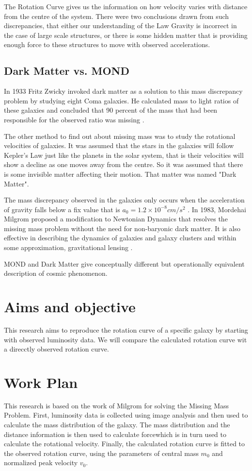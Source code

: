  The Rotation Curve gives us the information on how   velocity varies with distance from the centre of the system. There were two conclusions drawn from such discrepancies, that either our understanding of the Law Gravity is incorrect in the case of large scale structures, or there is some hidden matter that is providing enough force to these structures to move with observed accelerations.

\subsection{Dark Matter vs. MOND}
   In 1933 Fritz Zwicky invoked dark matter as a solution to this mass discrepancy problem by studying eight Coma galaxies. He calculated mass to light ratios of these galaxies and concluded that 90 percent of the mass that had been responsible for the observed ratio was missing \cite{dm_3}. 
   
   The other method to find out about missing mass was to study the rotational velocities of galaxies. It was assumed that the stars in the galaxies will follow  Kepler's Law just like the planets in the solar system, that is their velocities will show a decline as one moves away from the centre. So it was assumed that there is some invisible matter affecting their motion. That matter was named "Dark Matter".
   
 The mass discrepancy observed in the galaxies only occurs when the acceleration of gravity falls below a fix value that is $a_{0}= 1.2 \times 10^{-8} cm/s^2$ \cite{mond_1} \cite{mond} \cite{dm_1} \cite{dm_2}. In 1983, Mordehai Milgrom proposed a modification to Newtonian Dynamics that resolves the missing mass problem without  the need for non-baryonic dark matter. It is also effective in describing the dynamics of galaxies and galaxy clusters and within some approximation, gravitational lensing \cite{mond_2} \cite{mond_3}. 

MOND and Dark Matter give conceptually different but operationally equivalent description of cosmic phenomenon.

\section{Aims and objective}
This research aims to reproduce the rotation curve of a specific galaxy by starting with observed luminosity data. We will compare the calculated rotation curve wit a direcctly observed rotation curve.

\section{Work Plan}
 This research is based on the work of Milgrom for solving the Missing Mass Problem. First, luminosity  data is collected using image analysis and then used to calculate the mass distribution of the galaxy. The mass distribution and the distance information is then used to calculate forcewhich is in turn used to calculate  the rotational velocity. Finally, the calculated  rotation curve is fitted to the observed rotation curve, using the parameters of central mass $ m_{0}$ and normalized peak velocity $ v_{0} $. 
